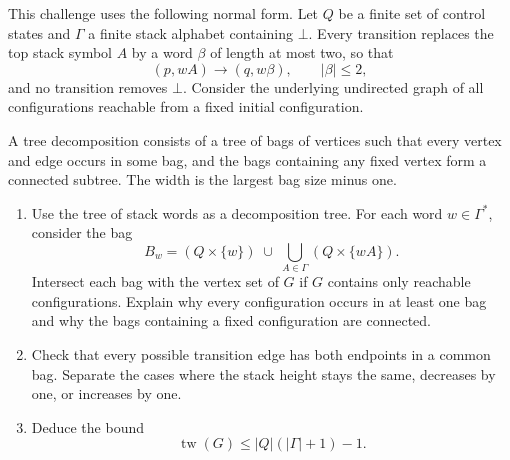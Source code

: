 \documentclass{tutorial}
\begin{document}
\begin{exercise}
This challenge uses the following normal form. Let $Q$ be a finite set of
control states and $\Gamma$ a finite stack alphabet containing $\bot$.
Every transition replaces the top stack symbol $A$ by a word $\beta$ of
length at most two, so that
\[
  (p,wA)\longrightarrow(q,w\beta),
  \qquad |\beta|\leq 2,
\]
and no transition removes $\bot$. Consider the underlying undirected graph
of all configurations reachable from a fixed initial configuration.

A tree decomposition consists of a tree of bags of vertices such that
every vertex and edge occurs in some bag, and the bags containing any
fixed vertex form a connected subtree. The width is the largest bag size
minus one.
\begin{enumerate}
  \item Use the tree of stack words as a decomposition tree. For each word
        $w\in\Gamma^*$, consider the bag
        \[
          B_w=(Q\times\{w\})\;\cup\;
              \bigcup_{A\in\Gamma}(Q\times\{wA\}).
        \]
            Intersect each bag with the vertex set of $G$ if $G$ contains only
            reachable configurations.
        Explain why every configuration occurs in at least one bag and
        why the bags containing a fixed configuration are connected.
  \item Check that every possible transition edge has both endpoints in
        a common bag. Separate the cases where the stack height stays the
        same, decreases by one, or increases by one.
  \item Deduce the bound
        \[
          \operatorname{tw}(G)\leq |Q|(|\Gamma|+1)-1.
        \]
\end{enumerate}
\end{exercise}
\end{document}
